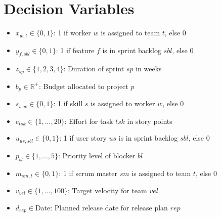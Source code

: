 \documentclass{article}
\begin{document}
\section{Decision Variables}
\begin{itemize}
    \item $x_{w,t} \in \{0,1\}$: 1 if worker $w$ is assigned to team $t$, else 0
    \item $y_{f,sbl} \in \{0,1\}$: 1 if feature $f$ is in sprint backlog $sbl$, else 0
    \item $z_{sp} \in \{1,2,3,4\}$: Duration of sprint $sp$ in weeks
    \item $b_p \in \mathbb{R}^+$: Budget allocated to project $p$
    \item $s_{s,w} \in \{0,1\}$: 1 if skill $s$ is assigned to worker $w$, else 0
    \item $e_{tsk} \in \{1,...,20\}$: Effort for task $tsk$ in story points
    \item $u_{us,sbl} \in \{0,1\}$: 1 if user story $us$ is in sprint backlog $sbl$, else 0
    \item $p_{bl} \in \{1,...,5\}$: Priority level of blocker $bl$
    \item $m_{sm,t} \in \{0,1\}$: 1 if scrum master $sm$ is assigned to team $t$, else 0
    \item $v_{vel} \in \{1,...,100\}$: Target velocity for team $vel$
    \item $d_{rep} \in \text{Date}$: Planned release date for release plan $rep$
\end{itemize}
\end{document}
